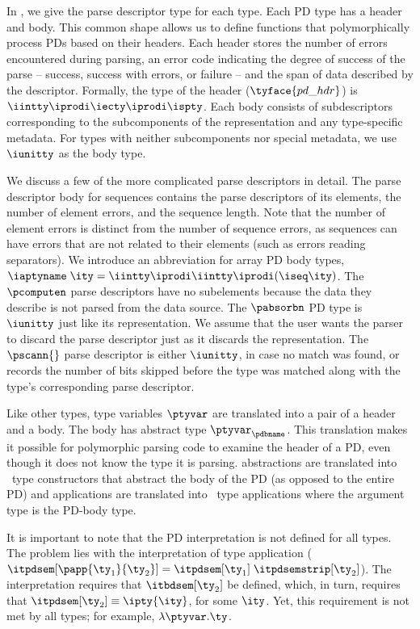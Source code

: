 In , we give the parse descriptor type for each
\ddc{} type. Each PD type has a header and body.  This common shape
allows us to define functions that polymorphically process PDs based
on their headers. Each header stores the number of errors encountered
during parsing, an error code indicating the degree of success of the
parse -- success, success with errors, or failure -- and the span of
data described by the descriptor.  Formally, the type of the header
($\tyface{pd\_hdr}$) is $\iintty \iprodi \iecty \iprodi \ispty$.  Each
body consists of subdescriptors corresponding to the subcomponents of
the representation and any type-specific metadata. For types with
neither subcomponents nor special metadata, we use $\iunitty$ as the
body type.

We discuss a few of the more complicated parse descriptors in detail.
The parse descriptor body for sequences contains the parse descriptors
of its elements, the number of element errors, and the sequence
length. Note that the number of element errors is distinct from the
number of sequence errors, as sequences can have errors that are not
related to their elements (such as errors reading separators).  We
introduce an abbreviation for array PD body types, $\iaptyname \; \ity
= \iintty \iprodi \iintty \iprodi (\iseq \ity)$.  The $\pcomputen$
parse descriptors have no subelements because the data they describe
is not parsed from the data source.  The $\pabsorbn$ PD type is
$\iunitty$ just like its representation. We assume that the user wants the parser to discard the parse descriptor just as it discards the representation.  The $\pscann{}$ parse descriptor is either $\iunitty$, in
case no match was found, or records the number of bits skipped before
the type was matched along with the type's corresponding parse
descriptor.

Like other types, \ddca{} type variables $\ptyvar$ are translated into
a pair of a header and a body.  The body has abstract type
$\ptyvar_\pdbname$.  This translation makes it possible for
polymorphic parsing code to examine the header of a PD, even though it
does not know the \ddca{} type it is parsing.  \ddca{} abstractions
are translated into \fomega\ type constructors that abstract the body
of the PD (as opposed to the entire PD) and \ddca{} applications are
translated into \fomega\ type applications where the argument type is
the PD-body type. 

It is important to note that the PD interpretation is not defined for
all types. The problem lies with the interpretation of type
application ($\itpdsem[\papp {\ty_1} {\ty_2}] = \itpdsem[\ty_1] \;
\itpdsemstrip[\ty_2]$).  The interpretation requires that $\itbdsem[\ty_2]$ be
defined, which, in turn, requires that $\itpdsem[\ty_2] \equiv
\ipty{\ity}$, for some $\ity$.  Yet, this requirement is not met by
all types; for example, $\lambda \ptyvar.\ty$.

